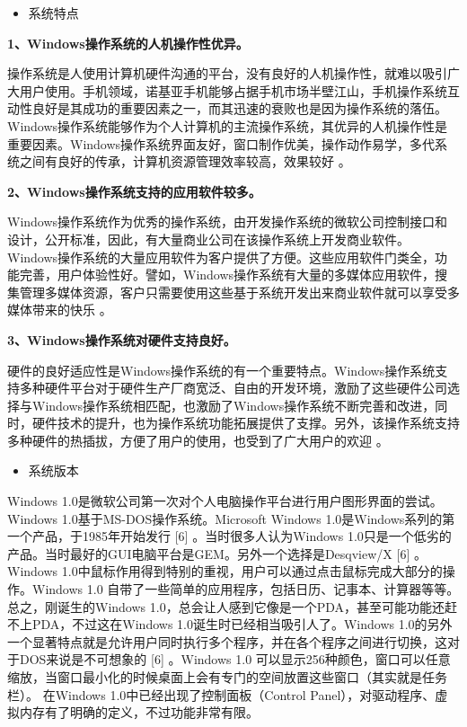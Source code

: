 \documentclass[
]{article}
\begin{document}
\begin{itemize}
\item
  系统特点
\end{itemize}

\textbf{1、Windows操作系统的人机操作性优异。}

操作系统是人使用计算机硬件沟通的平台，没有良好的人机操作性，就难以吸引广大用户使用。手机领域，诺基亚手机能够占据手机市场半壁江山，手机操作系统互动性良好是其成功的重要因素之一，而其迅速的衰败也是因为操作系统的落伍。Windows操作系统能够作为个人计算机的主流操作系统，其优异的人机操作性是重要因素。Windows操作系统界面友好，窗口制作优美，操作动作易学，多代系统之间有良好的传承，计算机资源管理效率较高，效果较好
。

\textbf{2、Windows操作系统支持的应用软件较多。}

Windows操作系统作为优秀的操作系统，由开发操作系统的微软公司控制接口和设计，公开标准，因此，有大量商业公司在该操作系统上开发商业软件。Windows操作系统的大量应用软件为客户提供了方便。这些应用软件门类全，功能完善，用户体验性好。譬如，Windows操作系统有大量的多媒体应用软件，搜集管理多媒体资源，客户只需要使用这些基于系统开发出来商业软件就可以享受多媒体带来的快乐
。

\textbf{3、Windows操作系统对硬件支持良好。}

硬件的良好适应性是Windows操作系统的有一个重要特点。Windows操作系统支持多种硬件平台对于硬件生产厂商宽泛、自由的开发环境，激励了这些硬件公司选择与Windows操作系统相匹配，也激励了Windows操作系统不断完善和改进，同时，硬件技术的提升，也为操作系统功能拓展提供了支撑。另外，该操作系统支持多种硬件的热插拔，方便了用户的使用，也受到了广大用户的欢迎
。

\begin{itemize}
\item
  系统版本
\end{itemize}

Windows
1.0是微软公司第一次对个人电脑操作平台进行用户图形界面的尝试。Windows
1.0基于MS-DOS操作系统。Microsoft Windows
1.0是Windows系列的第一个产品，于1985年开始发行 {[}6{]}
。当时很多人认为Windows
1.0只是一个低劣的产品。当时最好的GUI电脑平台是GEM。另外一个选择是Desqview/X
{[}6{]} 。Windows
1.0中鼠标作用得到特别的重视，用户可以通过点击鼠标完成大部分的操作。Windows
1.0
自带了一些简单的应用程序，包括日历、记事本、计算器等等。总之，刚诞生的Windows
1.0，总会让人感到它像是一个PDA，甚至可能功能还赶不上PDA，不过这在Windows
1.0诞生时已经相当吸引人了。Windows
1.0的另外一个显著特点就是允许用户同时执行多个程序，并在各个程序之间进行切换，这对于DOS来说是不可想象的
{[}6{]} 。Windows 1.0
可以显示256种颜色，窗口可以任意缩放，当窗口最小化的时候桌面上会有专门的空间放置这些窗口（其实就是任务栏）。
在Windows 1.0中已经出现了控制面板（Control
Panel），对驱动程序、虚拟内存有了明确的定义，不过功能非常有限。
\end{document}
